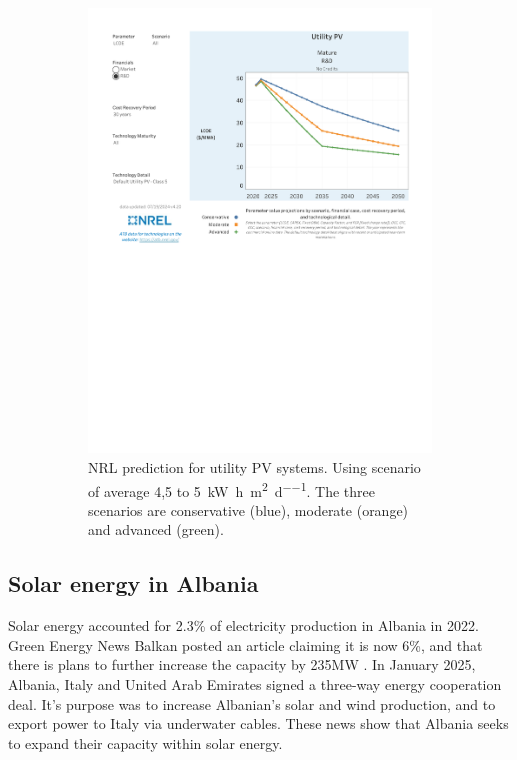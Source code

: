 \begin{figure}[H]
\begin{subfigure}[b]{0.48\textwidth}
        \includegraphics[width=\textwidth]{photos/LCOE_UtilityPV_NRL.pdf}
        \caption{NRL prediction for utility PV systems. Using scenario of average 4,5 to \SI{5}{\kilo\watt\hour\per\square\meter\per\day}. The three scenarios are conservative (blue), moderate (orange) and advanced (green).}
    \end{subfigure}
    \caption{}
    \label{fig:back-lcoe-nrl}
\end{figure}

\subsection{Solar energy in Albania}
Solar energy accounted for 2.3\% of electricity production in Albania in 2022\citep{internationalenergyagencyAlbaniaCountriesRegions2025}. Green Energy News Balkan posted an article claiming it is now 6\%, and that there is plans to further increase the capacity by  235MW \citep{igortodorovicSolarPowerDevelopers2025}. In January 2025, Albania, Italy and United Arab Emirates signed a three-way energy cooperation deal. It's purpose was to increase Albanian's solar and wind production, and to export power to Italy via underwater cables\citep{euronewsgreenItalyAlbaniaAgree2025}. These news show that Albania seeks to expand their capacity within solar energy. 

